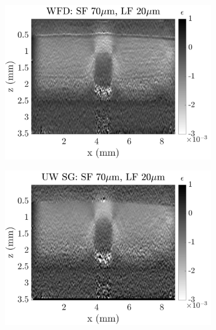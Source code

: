 \begin{figure}[h]
	\centering
    \begin{subfigure}{0.49\textwidth}
    	\centering
        \includegraphics[width=\textwidth]{appendix_figs/wls_fr70_lr20.png}
    \end{subfigure}
    \begin{subfigure}{0.49\textwidth}
    	\centering
        \includegraphics[width=\textwidth]{appendix_figs/uwsg_fr70_lr20.png}
    \end{subfigure}
    \\
    \begin{subfigure}{0.49\textwidth}
    	\centering

\end{subfigure}
\end{figure}
